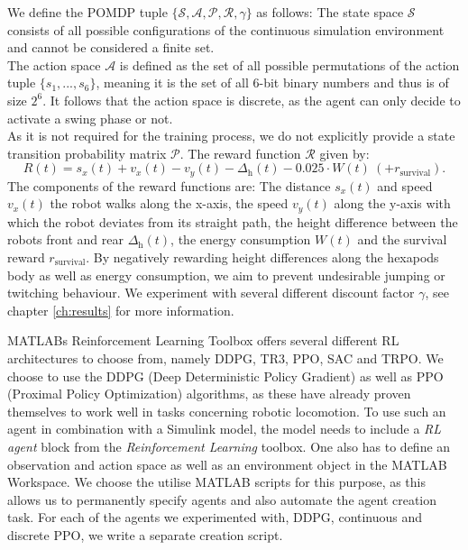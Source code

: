 We define the POMDP tuple $\mathcal{\{S,A,P,R,\gamma\}}$ as follows:
The state space $\mathcal{S}$ consists of all possible configurations of the continuous simulation environment and cannot be considered a finite set.\\
The action space $\mathcal{A}$ is defined as the set of all possible permutations of the action tuple $\{s_1,...,s_6\}$, meaning it is the set of all 6-bit binary numbers and thus is of size $2^6$.
It follows that the action space is discrete, as the agent can only decide to activate a swing phase or not.\\
As it is not required for the training process, we do not explicitly provide a state transition probability matrix $\mathcal{P}$.
The reward function $\mathcal{R}$ given by:
 \[
 R(t) = s_x(t) + v_x(t) - v_y(t) - \Delta_\text{h}(t) - 0.025 \cdot W(t) \ (+ r_\text{survival}).
 \]
The components of the reward functions are:
The distance $s_x(t)$ and speed $v_x(t)$ the robot walks along the x-axis, the speed $v_y(t)$ along the y-axis with which the robot deviates from its straight path, the height difference between the robots front and rear $\Delta_\text{h}(t)$, the energy consumption $W(t)$ and the survival reward $r_\text{survival}$.
By negatively rewarding height differences along the hexapods body as well as energy consumption, we aim to prevent undesirable jumping or twitching behaviour.
We experiment with several different discount factor $\gamma$, see chapter \ref{ch:results} for more information.

MATLABs Reinforcement Learning Toolbox offers several different RL architectures to choose from, namely DDPG, TR3, PPO, SAC and TRPO.
We choose to use the DDPG (Deep Deterministic Policy Gradient) as well as PPO (Proximal Policy Optimization) algorithms, as these have already proven themselves to work well in tasks concerning robotic locomotion\parencite{FIND AUTHOR}.
To use such an agent in combination with a Simulink model, the model needs to include a \textit{RL agent} block from the \textit{Reinforcement Learning} toolbox.
One also has to define an observation and action space as well as an environment object in the MATLAB Workspace.
We choose the utilise MATLAB scripts for this purpose, as this allows us to permanently specify agents and also automate the agent creation task.
For each of the agents we experimented with, DDPG, continuous and discrete PPO, we write a separate creation script.

